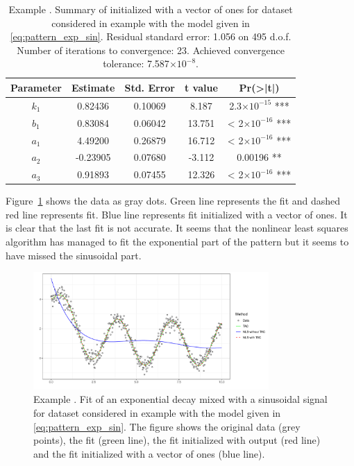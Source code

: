 \begin{table}[htb]
\centering
\begin{tabular}{ccccc}
\toprule
Parameter &  Estimate & Std. Error & t value & Pr(>|t|)\\    
\midrule      
$k_1$ & 0.82436  &  0.10069 &  8.187 & 2.3$\times 10^{-15}$ ***\\
$b_1$  & 0.83084 &   0.06042 & 13.751 & < 2$\times 10^{-16}$ ***\\
$a_1$ & 4.49200  &  0.26879 & 16.712 & < 2$\times 10^{-16}$ ***\\
$a_2$ & -0.23905 &   0.07680 & -3.112 & 0.00196 ** \\
$a_3$ & 0.91893 &   0.07455 & 12.326 & < 2$\times 10^{-16}$ ***\\
\bottomrule 
\end{tabular} 
\caption{Example . Summary of  initialized with a vector of ones for dataset considered in example  with the model given in \eqref{eq:pattern_exp_sin}. Residual standard error: 1.056 on 495 d.o.f. Number of iterations to convergence: 23. Achieved convergence tolerance:  7.587$\times 10^{-8}$.}
\label{t:one_exponential_one_sinusodial_summary_NLS_bad_approximation}
\end{table}




Figure~\ref{fig:one_exponential_one_sinusodial} shows the data as gray dots. Green line represents the  fit and dashed red line represents  fit. Blue line represents  fit initialized with a vector of ones. It is clear that the last fit is not accurate. It seems that the nonlinear least squares algorithm has managed to fit the exponential part of the pattern but it seems to have missed the sinusoidal part.


\begin{figure}[htb]
\centering
\includegraphics[width=0.8\textwidth]{example4.pdf}
\caption{Example . Fit of an exponential decay mixed with a sinusoidal signal for dataset considered in example  with the model given in \eqref{eq:pattern_exp_sin}. The figure shows the original data (grey points), the  fit (green line), the  fit initialized with  output (red line) and the   fit initialized with a vector of ones (blue line).}
\label{fig:one_exponential_one_sinusodial}
\end{figure}







